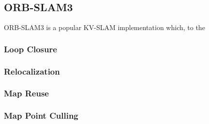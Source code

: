 \subsection{ORB-SLAM3}

ORB-SLAM3 is a popular KV-SLAM implementation which, to the 

\subsubsection{Loop Closure}
\subsubsection{Relocalization}
\subsubsection{Map Reuse}
\subsubsection{Map Point Culling}